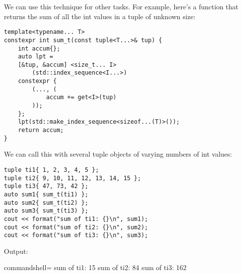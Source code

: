 We can use this technique for other tasks. For example, here's a function that returns the sum of all the int values in a tuple of unknown size:

\begin{lstlisting}[style=styleCXX]
template<typename... T>
constexpr int sum_t(const tuple<T...>& tup) {
	int accum{};
	auto lpt =
	[&tup, &accum] <size_t... I>
		(std::index_sequence<I...>)
	constexpr {
		(..., (
			accum += get<I>(tup)
		));
	};
	lpt(std::make_index_sequence<sizeof...(T)>());
	return accum;
}
\end{lstlisting}

We can call this with several tuple objects of varying numbers of int values:

\begin{lstlisting}[style=styleCXX]
tuple ti1{ 1, 2, 3, 4, 5 };
tuple ti2{ 9, 10, 11, 12, 13, 14, 15 };
tuple ti3{ 47, 73, 42 };
auto sum1{ sum_t(ti1) };
auto sum2{ sum_t(ti2) };
auto sum3{ sum_t(ti3) };
cout << format("sum of ti1: {}\n", sum1);
cout << format("sum of ti2: {}\n", sum2);
cout << format("sum of ti3: {}\n", sum3);
\end{lstlisting}

Output:

\begin{tcblisting}{commandshell={}}
sum of ti1: 15
sum of ti2: 84
sum of ti3: 162
\end{tcblisting}










